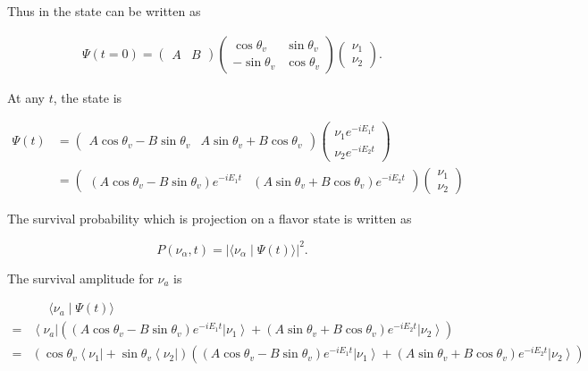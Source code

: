 \documentclass{tufte-handout}
\newcommand{\bra}[1]{\left\langle #1\right|}
\newcommand{\ket}[1]{\left| #1\right\rangle}
\newcommand{\braket}[2]{\langle #1 \mid #2 \rangle}
\begin{document}
Thus in the state can be written as

\begin{align}
    \Psi(t=0) = \begin{pmatrix}
        A & B 
    \end{pmatrix} \begin{pmatrix}
        \cos\theta_v & \sin\theta_v \\
        -\sin\theta_v & \cos\theta_v 
    \end{pmatrix}\begin{pmatrix}
        \nu_1 \\
        \nu_2
    \end{pmatrix}.
\end{align}

At any $t$, the state is

\begin{align}
    \Psi(t) &= \begin{pmatrix}
        A \cos\theta_v - B \sin\theta_v & A\sin\theta_v + B \cos\theta_v
    \end{pmatrix} \begin{pmatrix}
        \nu_1 e^{-i E_1 t}\\
        \nu_2 e^{-i E_2 t}
    \end{pmatrix} \\
    & = \begin{pmatrix}
        (A \cos\theta_v - B \sin\theta_v) e^{-iE_1 t} & (A\sin\theta_v + B \cos\theta_v
        ) e^{-iE_2t}\end{pmatrix} \begin{pmatrix}
        \nu_1 \\
        \nu_2
    \end{pmatrix}
\end{align}

The survival probability which is projection on a flavor state is written as

\begin{equation}
    P(\nu_\alpha,t) = \lvert \braket{\nu_\alpha}{\Psi(t)} \rvert^2.
\end{equation}

The survival amplitude for $\nu_a$ is

\begin{align*}
    &\phantom{=}\braket{\nu_a}{\Psi(t)} \\
     =& \bra{\nu_a}\left(  ( A \cos\theta_v - B \sin\theta_v) e^{-iE_1 t} \ket{\nu_1} +  (A\sin\theta_v + B \cos\theta_v
    ) e^{-i E_2t} \ket{\nu_2} \right) \\
     =& \left ( \cos\theta_v \bra{\nu_1} + \sin\theta_v \bra{\nu_2} \right)  \left(   ( A \cos\theta_v - B \sin\theta_v) e^{-iE_1 t} \ket{\nu_1} +  (A\sin\theta_v + B \cos\theta_v
    ) e^{-i E_2 t} \ket{\nu_2}  \right )
\end{align*}
\end{document}
